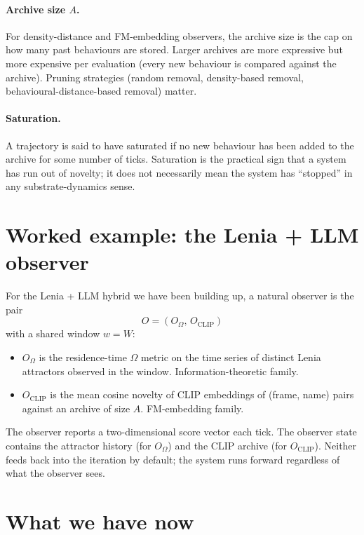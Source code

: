 \paragraph{Archive size $A$.} For density-distance and FM-embedding
observers, the archive size is the cap on how many past behaviours
are stored. Larger archives are more expressive but more expensive
per evaluation (every new behaviour is compared against the archive).
Pruning strategies (random removal, density-based removal,
behavioural-distance-based removal) matter.

\paragraph{Saturation.} A trajectory is said to have saturated if no
new behaviour has been added to the archive for some number of ticks.
Saturation is the practical sign that a system has run out of
novelty; it does not necessarily mean the system has ``stopped'' in
any substrate-dynamics sense.

\section{Worked example: the Lenia + LLM observer}

For the Lenia + LLM hybrid we have been building up, a natural
observer is the pair
\[
  O = (O_\Omega,\, O_{\mathrm{CLIP}})
\]
with a shared window $w = W$:

\begin{itemize}[leftmargin=1.5em,itemsep=2pt]
  \item $O_\Omega$ is the residence-time $\Omega$ metric on the time
    series of distinct Lenia attractors observed in the window.
    Information-theoretic family.
  \item $O_{\mathrm{CLIP}}$ is the mean cosine novelty of CLIP
    embeddings of (frame, name) pairs against an archive of size
    $A$. FM-embedding family.
\end{itemize}

The observer reports a two-dimensional score vector each tick. The
observer state contains the attractor history (for $O_\Omega$) and the
CLIP archive (for $O_{\mathrm{CLIP}}$). Neither feeds back into the
iteration by default; the system runs forward regardless of what the
observer sees.

\section{What we have now}

